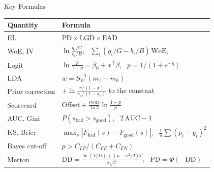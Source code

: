 \begin{frame}{Key Formulas}
\itemsize{\small}
{\renewcommand{\arraystretch}{1.4}\begin{center}
\small
\begin{tabular}{ll}
\toprule
\textbf{Quantity} & \textbf{Formula} \\
\midrule
EL & $\mathrm{PD} \times \mathrm{LGD} \times \mathrm{EAD}$ \\
WoE, IV & $\ln\frac{g_i/G}{b_i/B}$, \ $\sum_i (g_i/G - b_i/B)\,\mathrm{WoE}_i$ \\
Logit & $\ln\frac{p}{1 - p} = \beta_0 + x^\top\beta$, \ $p = 1/(1 + e^{-\eta})$ \\
LDA & $w = S_W^{-1}(m_1 - m_0)$ \\
Prior correction & $+\ln\frac{\pi/(1 - \pi)}{\pi_s/(1 - \pi_s)}$ to the constant \\
Scorecard & $\text{Offset} + \frac{\text{PDO}}{\ln 2}\ln\frac{1 - p}{p}$ \\
AUC, Gini & $P(s_{\text{bad}} > s_{\text{good}})$, \ $2\,\mathrm{AUC} - 1$ \\
KS, Brier & $\max_s|F_{\text{bad}}(s) - F_{\text{good}}(s)|$, \ $\frac1n\sum(p_i - y_i)^2$ \\
Bayes cut-off & $p > C_{FP}/(C_{FP} + C_{FN})$ \\
Merton & $\mathrm{DD} = \frac{\ln(V/D) + (\mu - \sigma^2/2)T}{\sigma\sqrt{T}}$, \ $\mathrm{PD} = \Phi(-\mathrm{DD})$ \\
\bottomrule
\end{tabular}
\end{center}
}
\end{frame}

